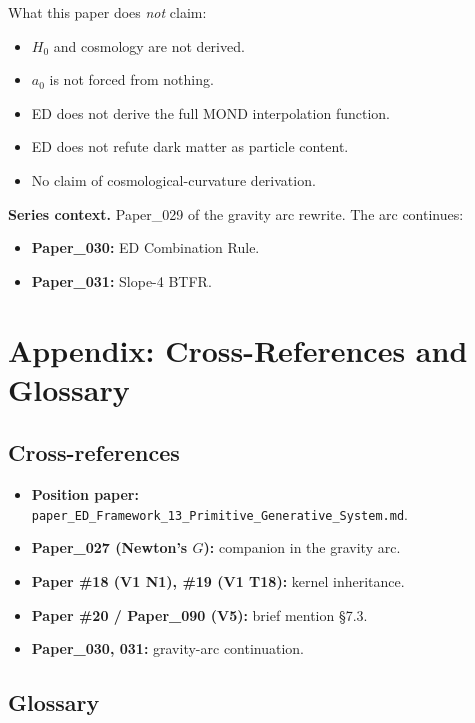 \documentclass[11pt,a4paper]{article}
\begin{document}
What this paper does \emph{not} claim:

\begin{itemize}[noitemsep]
\item $H_0$ and cosmology are not derived.
\item $a_0$ is not forced from nothing.
\item ED does not derive the full MOND interpolation function.
\item ED does not refute dark matter as particle content.
\item No claim of cosmological-curvature derivation.
\end{itemize}

\textbf{Series context.} Paper\_029 of the gravity arc rewrite. The arc continues:

\begin{itemize}[noitemsep]
\item \textbf{Paper\_030:} ED Combination Rule.
\item \textbf{Paper\_031:} Slope-4 BTFR.
\end{itemize}

\section*{Appendix: Cross-References and Glossary}

\subsection*{Cross-references}

\begin{itemize}[noitemsep]
\item \textbf{Position paper:} \texttt{paper\_ED\_Framework\_13\_Primitive\_Generative\_System.md}.
\item \textbf{Paper\_027 (Newton's $G$):} companion in the gravity arc.
\item \textbf{Paper \#18 (V1 N1), \#19 (V1 T18):} kernel inheritance.
\item \textbf{Paper \#20 / Paper\_090 (V5):} brief mention \S7.3.
\item \textbf{Paper\_030, 031:} gravity-arc continuation.
\end{itemize}

\subsection*{Glossary}
\end{document}
